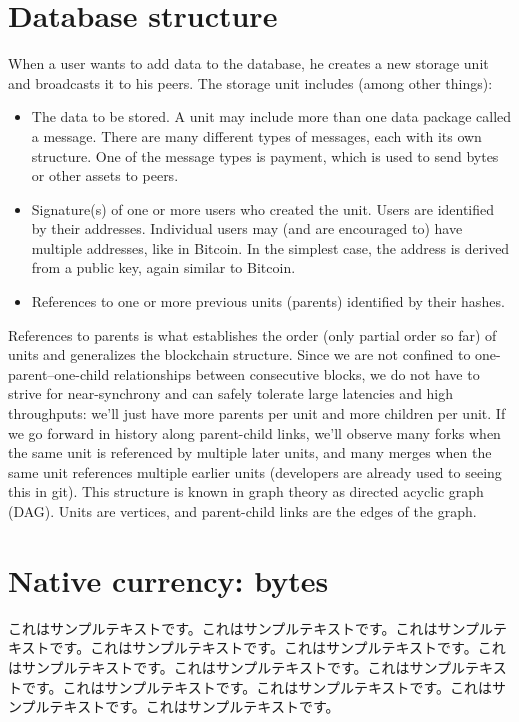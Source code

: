 \documentclass[a4paper, dvipdfmx]{jsarticle}
\begin{document}
\section{Database structure}

When a user wants to add data to the database, he creates a new storage unit and broadcasts it to his peers. The storage unit includes (among other things):
\begin{itemize}
    \item The data to be stored. A unit may include more than one data package called a message. There are many different types of messages, each with its own structure. One of the message types is payment, which is used to send bytes or other assets to peers.
    \item Signature(s) of one or more users who created the unit. Users are identified by their addresses. Individual users may (and are encouraged to) have multiple addresses, like in Bitcoin. In the simplest case, the address is derived from a public key, again similar to Bitcoin.
    \item References to one or more previous units (parents) identified by their hashes.
\end{itemize}
References to parents is what establishes the order (only partial order so far) of units and generalizes the blockchain structure. Since we are not confined to one-parent–one-child relationships between consecutive blocks, we do not have to strive for near-synchrony and can safely tolerate large latencies and high throughputs: we’ll just have more parents per unit and more children per unit. If we go forward in history along parent-child links, we’ll observe many forks when the same unit is referenced by multiple later units, and many merges when the same unit references multiple earlier units (developers are already used to seeing this in git). This structure is known in graph theory as directed acyclic graph (DAG). Units are vertices, and parent-child links are the edges of the graph.

\section{Native currency: bytes}
これはサンプルテキストです。これはサンプルテキストです。これはサンプルテキストです。これはサンプルテキストです。これはサンプルテキストです。これはサンプルテキストです。これはサンプルテキストです。これはサンプルテキストです。これはサンプルテキストです。これはサンプルテキストです。これはサンプルテキストです。これはサンプルテキストです。
\end{document}
